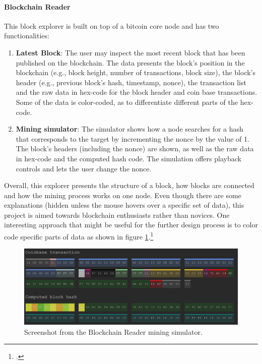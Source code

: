 \paragraph{Blockchain Reader} This block explorer is built on top of a bitcoin core node and has two functionalities:
\begin{enumerate}
    \item \textbf{Latest Block}: The user may inspect the most recent block that has been published on the blockchain. The data presents the block's position in the blockchain (e.g., block height, number of transactions, block size), the block's header (e.g., previous block's hash, timestamp, nonce), the transaction list and the raw data in hex-code for the block header and coin base transactions. Some of the data is color-coded, as to differentiate different parts of the hex-code.
    \item \textbf{Mining simulator}: The simulator shows how a node searches for a hash that corresponds to the target by incrementing the nonce by the value of 1. The block's headers (including the nonce) are shown, as well as the raw data in hex-code and the computed hash code. The simulation offers playback controls and lets the user change the nonce.
\end{enumerate}
Overall, this explorer presents the structure of a block, how blocks are connected and how the mining process works on one node. Even though there are some explanations (hidden unless the mouse hovers over a specific set of data), this project is aimed towards blockchain enthusiasts rather than novices. One interesting approach that might be useful for the further design process is to color code specific parts of data as shown in figure \ref{fig:BlockchainReader}.\footcite[Cf.][]{JornCYoghBlockchainReader2017}

\begin{figure}
    \centering
    \includegraphics[width=\linewidth]{latex-vorlage_v1.5/graphics/Bildschirmfo.png}
    \caption[Screenshot from the Blockchain Reader mining simulator.]{Screenshot from the Blockchain Reader mining simulator.\protect\footnotemark}
    \label{fig:BlockchainReader}
\end{figure}

